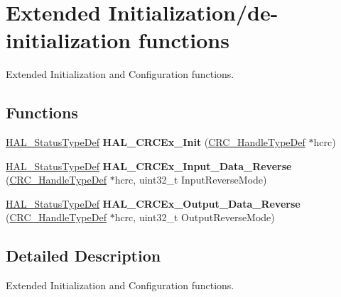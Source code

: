 \hypertarget{group___c_r_c_ex___exported___functions___group1}{}\section{Extended Initialization/de-\/initialization functions}
\label{group___c_r_c_ex___exported___functions___group1}


Extended Initialization and Configuration functions.  


\subsection*{Functions}
\begin{DoxyCompactItemize}
\item 
\mbox{\label{group___c_r_c_ex___exported___functions___group1_gacd1e002c13f6428882eb7fb309336e35}} 
\hyperlink{stm32f0xx__hal__def_8h_a63c0679d1cb8b8c684fbb0632743478f}{H\+A\+L\+\_\+\+Status\+Type\+Def} {\bfseries H\+A\+L\+\_\+\+C\+R\+C\+Ex\+\_\+\+Init} (\hyperlink{struct_c_r_c___handle_type_def}{C\+R\+C\+\_\+\+Handle\+Type\+Def} $\ast$hcrc)
\item 
\mbox{\label{group___c_r_c_ex___exported___functions___group1_ga026fab0d47210c4de4602b0363e404ea}} 
\hyperlink{stm32f0xx__hal__def_8h_a63c0679d1cb8b8c684fbb0632743478f}{H\+A\+L\+\_\+\+Status\+Type\+Def} {\bfseries H\+A\+L\+\_\+\+C\+R\+C\+Ex\+\_\+\+Input\+\_\+\+Data\+\_\+\+Reverse} (\hyperlink{struct_c_r_c___handle_type_def}{C\+R\+C\+\_\+\+Handle\+Type\+Def} $\ast$hcrc, uint32\+\_\+t Input\+Reverse\+Mode)
\item 
\mbox{\label{group___c_r_c_ex___exported___functions___group1_gacf9618694a44a4116fda182d43842514}} 
\hyperlink{stm32f0xx__hal__def_8h_a63c0679d1cb8b8c684fbb0632743478f}{H\+A\+L\+\_\+\+Status\+Type\+Def} {\bfseries H\+A\+L\+\_\+\+C\+R\+C\+Ex\+\_\+\+Output\+\_\+\+Data\+\_\+\+Reverse} (\hyperlink{struct_c_r_c___handle_type_def}{C\+R\+C\+\_\+\+Handle\+Type\+Def} $\ast$hcrc, uint32\+\_\+t Output\+Reverse\+Mode)
\end{DoxyCompactItemize}


\subsection{Detailed Description}
Extended Initialization and Configuration functions. 

